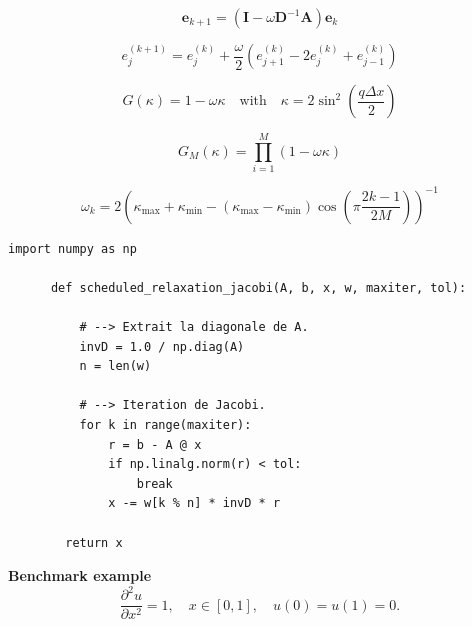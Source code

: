\documentclass[aspectratio=169]{beamer}
\begin{document}
\begin{frame}
  \begin{overprint}
    \[
    \bm{e}_{k+1} = \left( \bm{I} - \omega \bm{D}^{-1} \bm{A} \right) \bm{e}_k
    \]

    \[
    e_j^{(k+1)} = e_j^{(k)} + \dfrac{\omega}{2} \left( e_{j+1}^{(k)} - 2 e_j^{(k)} + e_{j-1}^{(k)} \right)
    \]

    \[
    G(\kappa) = 1 - \omega \kappa \quad \text{with} \quad \kappa = 2 \sin^2\left( \dfrac{q \Delta x}{2} \right)
    \]

    \[
    G_M(\kappa) = \prod_{i=1}^M \left( 1 - \omega \kappa \right)
    \]

    \[
    \omega_k = 2 \left( \kappa_{\max} + \kappa_{\min} - (\kappa_{\max} - \kappa_{\min}) \cos \left( \pi \dfrac{2k-1}{2M} \right) \right)^{-1}
    \]
  \end{overprint}
  \vspace{-1cm}
\end{frame}

{
  \begin{frame}[fragile]{}{}
    \vfill
    \begin{lstlisting}[backgroundcolor=\color{white}, basicstyle=\ttfamily\footnotesize\color{black}]
      import numpy as np
      
      def scheduled_relaxation_jacobi(A, b, x, w, maxiter, tol):
      
          # --> Extrait la diagonale de A.
          invD = 1.0 / np.diag(A)
          n = len(w)
          
          # --> Iteration de Jacobi.
          for k in range(maxiter):
              r = b - A @ x
              if np.linalg.norm(r) < tol:
                  break
              x -= w[k % n] * invD * r
        
        return x
    \end{lstlisting}
    \vfill
  \end{frame}
              }

\begin{frame}[t, c]{}{}
  \centering
  \textbf{Benchmark example}
  \medskip
  \large
  \[
  \dfrac{\partial^2 u}{\partial x^2} = 1, \quad x \in \left[0, 1\right], \quad u(0) = u(1) = 0.
  \]
  
  \vspace{-1cm}
\end{frame}
\end{document}
